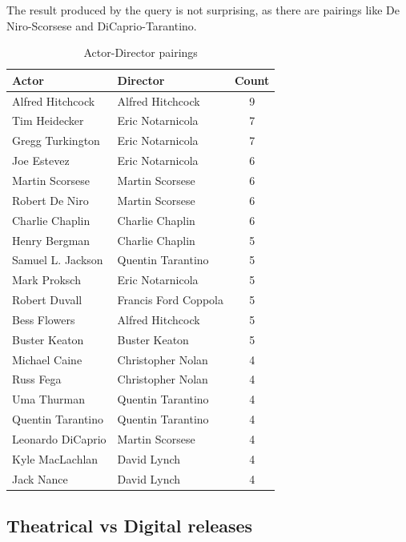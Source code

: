 \documentclass{Configuration_Files/PoliMi3i_thesis}
\begin{document}
\inputminted[frame=single,framesep=10pt,breaklines]{cypher}{letterboxd/queries/query9.cypher}

The result produced by the query is not surprising, as there are pairings like De Niro-Scorsese and DiCaprio-Tarantino.

\begin{table}[h!]
\centering
\begin{tabular}{|l|l|c|}
\hline
\textbf{Actor} & \textbf{Director} & \textbf{Count} \\ \hline
Alfred Hitchcock & Alfred Hitchcock & 9 \\ \hline
Tim Heidecker & Eric Notarnicola & 7 \\ \hline
Gregg Turkington & Eric Notarnicola & 7 \\ \hline
Joe Estevez & Eric Notarnicola & 6 \\ \hline
Martin Scorsese & Martin Scorsese & 6 \\ \hline
Robert De Niro & Martin Scorsese & 6 \\ \hline
Charlie Chaplin & Charlie Chaplin & 6 \\ \hline
Henry Bergman & Charlie Chaplin & 5 \\ \hline
Samuel L. Jackson & Quentin Tarantino & 5 \\ \hline
Mark Proksch & Eric Notarnicola & 5 \\ \hline
Robert Duvall & Francis Ford Coppola & 5 \\ \hline
Bess Flowers & Alfred Hitchcock & 5 \\ \hline
Buster Keaton & Buster Keaton & 5 \\ \hline
Michael Caine & Christopher Nolan & 4 \\ \hline
Russ Fega & Christopher Nolan & 4 \\ \hline
Uma Thurman & Quentin Tarantino & 4 \\ \hline
Quentin Tarantino & Quentin Tarantino & 4 \\ \hline
Leonardo DiCaprio & Martin Scorsese & 4 \\ \hline
Kyle MacLachlan & David Lynch & 4 \\ \hline
Jack Nance & David Lynch & 4 \\ \hline
\end{tabular}
\caption{Actor-Director pairings}
\label{tab:actor_director_pairings}
\end{table}

 \subsection{Theatrical vs Digital releases}
\end{document}

